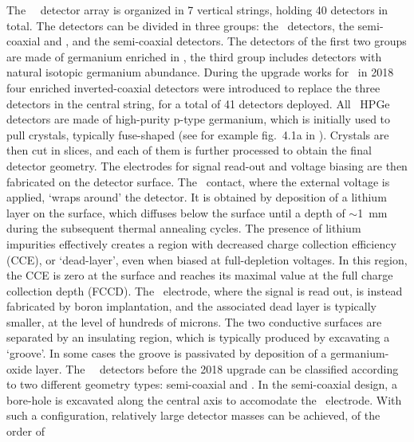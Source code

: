 The \gerda\ \phasetwo\ detector array is organized in 7 vertical strings, holding 40 detectors in
total. The detectors can be divided in three groups: the \bege\ detectors, the
semi-coaxial  and , and the semi-coaxial  detectors. The detectors of
the first two groups are made of germanium enriched in \gesix, the third group includes
detectors with natural isotopic germanium abundance. During the upgrade works for
\phasetwop\ in 2018 four enriched inverted-coaxial \IC{} detectors were introduced to
replace the three \GTF{} detectors in the central string, for a total of 41 detectors
deployed.
\newpar
All \gerda\ HPGe detectors are made of high-purity p-type germanium, which is initially
used to pull crystals, typically fuse-shaped (see for example fig.~4.1a in
\cite{Yonenaga2019}).  Crystals are then cut in slices, and each of them is further
processed to obtain the final detector geometry. The electrodes for signal read-out and
voltage biasing are then fabricated on the detector surface. The \nplus\ contact, where the
external voltage is applied, `wraps around' the detector. It is obtained by deposition of
a lithium layer on the surface, which diffuses below the surface until a depth of
$\sim$1~mm during the subsequent thermal annealing cycles. The presence of lithium
impurities effectively creates a region with decreased charge collection efficiency (CCE),
or `dead-layer', even when biased at full-depletion voltages.  In this region, the CCE is
zero at the surface and reaches its maximal value at the full charge collection depth
(FCCD). The \pplus\ electrode, where the signal is read out, is instead fabricated by boron
implantation, and the associated dead layer is typically smaller, at the level of
hundreds of microns. The two conductive surfaces are separated by an insulating region,
which is typically produced by excavating a `groove'. In some cases the groove is
passivated by deposition of a germanium-oxide layer.
\newpar
{}
The \gerda\ \phasetwo\ detectors before the 2018 upgrade can be classified according to
two different geometry types: semi-coaxial and \bege. In the semi-coaxial design, a
bore-hole is excavated along the central axis to accomodate the \pplus\ electrode. With
such a configuration, relatively large detector masses can be achieved, of the order of
